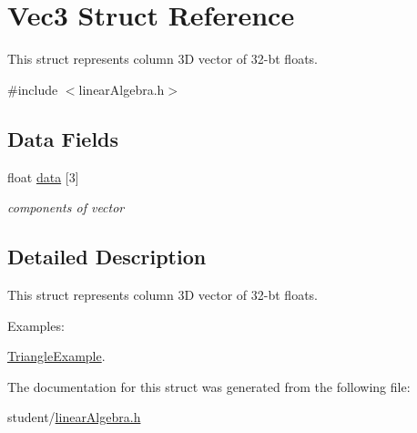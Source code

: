 \hypertarget{structVec3}{\section{Vec3 Struct Reference}
\label{structVec3}
}


This struct represents column 3\-D vector of 32-\/bt floats.  




{\ttfamily \#include $<$linear\-Algebra.\-h$>$}

\subsection*{Data Fields}
\begin{DoxyCompactItemize}
\item 
\hypertarget{structVec3_ab4091bcbf544cb1ae91ba8855ddaaa0b}{float \hyperlink{structVec3_ab4091bcbf544cb1ae91ba8855ddaaa0b}{data} \mbox{[}3\mbox{]}}\label{structVec3_ab4091bcbf544cb1ae91ba8855ddaaa0b}

\begin{DoxyCompactList}\small\item\em components of vector \end{DoxyCompactList}\end{DoxyCompactItemize}


\subsection{Detailed Description}
This struct represents column 3\-D vector of 32-\/bt floats. \begin{Desc}
\item[Examples\-: ]\par
\hyperlink{TriangleExample-example}{Triangle\-Example}.\end{Desc}


The documentation for this struct was generated from the following file\-:\begin{DoxyCompactItemize}
\item 
student/\hyperlink{linearAlgebra_8h}{linear\-Algebra.\-h}\end{DoxyCompactItemize}
